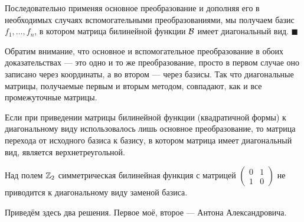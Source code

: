 Последовательно применяя основное преобразование и дополняя его в необходимых случаях вспомогательными преобразованиями, мы получаем базис $f_1, \ldots, f_n$, в котором матрица билинейной функции $\mathcal{B}$ имеет диагональный вид.
\hfill$\blacksquare$\par\smallskip

Обратим внимание, что основное и вспомогательное преобразование в обоих доказательствах --- это одно и то же преобразование, просто в первом случае оно записано через координаты, а во втором --- через базисы. Так что диагональные матрицы, получаемые первым и вторым методом, совпадают, как и все промежуточные матрицы.

\begin{remark}
    Если при приведении матрицы билинейной функции (квадратичной формы) к диагональному виду использовалось лишь основное преобразование, то матрица перехода от исходного базиса к базису, в котором матрица имеет диагональный вид, является верхнетреугольной.
\end{remark}

\begin{problem}
    Над полем $\mathbb{Z}_2$ симметрическая билинейная функция с матрицей
    $
    \begin{pmatrix}
        0 & 1\\
        1 & 0
    \end{pmatrix}
    $
    не приводится к диагональному виду заменой базиса.
\end{problem}

Приведём здесь два решения. Первое моё, второе --- Антона Александровича.

